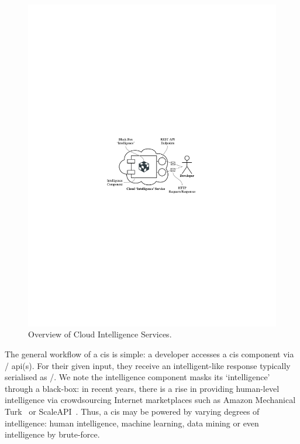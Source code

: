 \begin{figure}[h!]
\centering
\caption[Overview of cloud intelligence services]{Overview of Cloud Intelligence Services.}
\label{fig:introduction:cloud-intelliegnce-service}
\includegraphics{cloud-intelliegnce-service}
\end{figure}

 
The general workflow of a \gls{cis} is  simple: a developer accesses a \gls{cis} component via / \gls{api}(s). For their given input, they receive an intelligent-like response typically serialised as /. We note the intelligence component masks its `intelligence' through a black-box: in recent years, there is a rise in providing human-level intelligence via crowdsourcing Internet marketplaces such as Amazon Mechanical Turk~ or ScaleAPI~. Thus, a \gls{cis} may be powered by varying degrees of intelligence: human intelligence, machine learning, data mining or even intelligence by brute-force.

